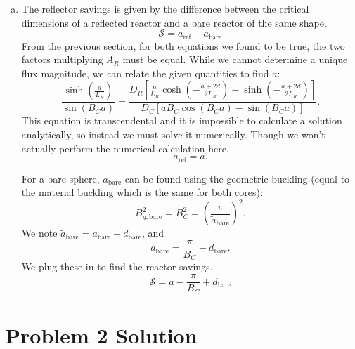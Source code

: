 \documentclass{report}
\begin{document}
\begin{enumerate}[a)]
\item 

The reflector savings is given by the difference between the critical dimensions of a reflected reactor and a bare reactor of the same shape.
$$ \mathcal{S} = a_{\text{ref}} - a_{\text{bare}} $$
From the previous section, for both equations we found to be true, the two factors multiplying $A_R$ must be equal. While we cannot determine a unique flux magnitude, we can relate the given quantities to find $a$:
$$ \frac{\sinh\left(\frac{a}{L_R}\right)}{\sin\left(B_C a\right)} = \frac{D_R \left[\frac{a}{L_R}\cosh\left(-\frac{a+2d}{2L_R}\right) - \sinh\left(-\frac{a+2d}{2L_R}\right)\right]}{D_C \left[a B_C \cos\left(B_C a\right) - \sin\left(B_C a\right)\right]}.$$
This equation is transcendental and it is impossible to calculate a solution analytically, so instead we must solve it numerically. Though we won't actually perform the numerical calculation here,
$$ a_{\text{ref}} = a .$$

For a bare sphere, $a_{\text{bare}}$ can be found using the geometric buckling (equal to the material buckling which is the same for both cores): 
$$ B_{g,\text{bare}}^2 = B_C^2 = \left(\frac{\pi}{\tilde{a}_{\text{bare}}}\right)^2 .$$
We note $\tilde{a}_{\text{bare}} = a_{\text{bare}} + d_{\text{bare}}$, and 
$$ a_{\text{bare}} = \frac{\pi}{B_C} - d_{\text{bare}} .$$
We plug these in to find the reactor savings.
$$\boxed{ \mathcal{S} = a - \frac{\pi}{B_C} + d_{\text{bare}} }$$
\end{enumerate}



\newpage


\section*{Problem 2 Solution}
\end{document}
